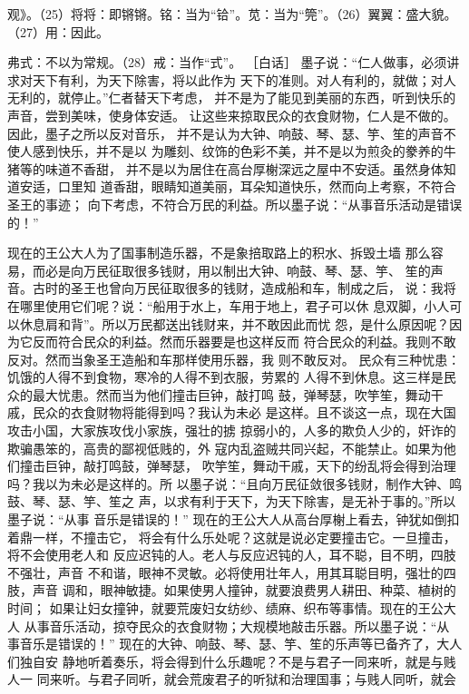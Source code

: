 \documentclass[12pt,UTF8]{ctexbook}
\begin{document}
观》。（25）将将：即锵锵。铭：当为“铪”。苋：当为“筦”。（26）翼翼：盛大貌。（27）用：因此。 

弗式：不以为常规。（28）戒：当作“式”。 
［白话］ 
墨子说：“仁人做事，必须讲求对天下有利，为天下除害，将以此作为 
天下的准则。对人有利的，就做；对人无利的，就停止。”仁者替天下考虑， 
并不是为了能见到美丽的东西，听到快乐的声音，尝到美味，使身体安适。 
让这些来掠取民众的衣食财物，仁人是不做的。因此，墨子之所以反对音乐， 
并不是认为大钟、响鼓、琴、瑟、竽、笙的声音不使人感到快乐，并不是以 
为雕刻、纹饰的色彩不美，并不是以为煎灸的豢养的牛猪等的味道不香甜， 
并不是以为居住在高台厚榭深远之屋中不安适。虽然身体知道安适，口里知 
道香甜，眼睛知道美丽，耳朵知道快乐，然而向上考察，不符合圣王的事迹； 
向下考虑，不符合万民的利益。所以墨子说：“从事音乐活动是错误的！” 

现在的王公大人为了国事制造乐器，不是象掊取路上的积水、拆毁土墙 
那么容易，而必是向万民征取很多钱财，用以制出大钟、响鼓、琴、瑟、竽、 
笙的声音。古时的圣王也曾向万民征取很多的钱财，造成船和车，制成之后， 
说：我将在哪里使用它们呢？说：“船用于水上，车用于地上，君子可以休 
息双脚，小人可以休息肩和背”。所以万民都送出钱财来，并不敢因此而忧 
怨，是什么原因呢？因为它反而符合民众的利益。然而乐器要是也这样反而 
符合民众的利益。我则不敢反对。然而当象圣王造船和车那样使用乐器，我 
则不敢反对。 
民众有三种忧患：饥饿的人得不到食物，寒冷的人得不到衣服，劳累的 
人得不到休息。这三样是民众的最大忧患。然而当为他们撞击巨钟，敲打鸣 
鼓，弹琴瑟，吹竽笙，舞动干戚，民众的衣食财物将能得到吗？我认为未必 
是这样。且不谈这一点，现在大国攻击小国，大家族攻伐小家族，强壮的掳 
掠弱小的，人多的欺负人少的，奸诈的欺骗愚笨的，高贵的鄙视低贱的，外 
寇内乱盗贼共同兴起，不能禁止。如果为他们撞击巨钟，敲打鸣鼓，弹琴瑟， 
吹竽笙，舞动干戚，天下的纷乱将会得到治理吗？我以为未必是这样的。所 
以墨子说：“且向万民征敛很多钱财，制作大钟、鸣鼓、琴、瑟、竽、笙之 
声，以求有利于天下，为天下除害，是无补于事的。”所以墨子说：“从事 
音乐是错误的！” 
现在的王公大人从高台厚榭上看去，钟犹如倒扣着鼎一样，不撞击它， 
将会有什么乐处呢？这就是说必定要撞击它。一旦撞击，将不会使用老人和 
反应迟钝的人。老人与反应迟钝的人，耳不聪，目不明，四肢不强壮，声音 
不和谐，眼神不灵敏。必将使用壮年人，用其耳聪目明，强壮的四肢，声音 
调和，眼神敏捷。如果使男人撞钟，就要浪费男人耕田、种菜、植树的时间； 
如果让妇女撞钟，就要荒废妇女纺纱、绩麻、织布等事情。现在的王公大人 
从事音乐活动，掠夺民众的衣食财物；大规模地敲击乐器。所以墨子说：“从 
事音乐是错误的！” 
现在的大钟、响鼓、琴、瑟、竽、笙的乐声等已备齐了，大人们独自安 
静地听着奏乐，将会得到什么乐趣呢？不是与君子一同来听，就是与贱人一 
同来听。与君子同听，就会荒废君子的听狱和治理国事；与贱人同听，就会 
\end{document}
